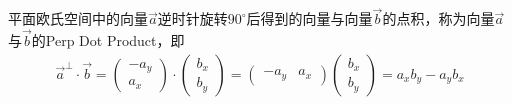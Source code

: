 \begin{definition}
  平面欧氏空间中的向量$\vec a$逆时针旋转$90^\circ$后得到的向量与向量$\vec b$的点积，称为向量$\vec a$与$\vec b$的Perp Dot Product，即
  \begin{align*}
    \vec a^\perp \cdot \vec b =
    \begin{pmatrix}
      -a_y\\ a_x
    \end{pmatrix} \cdot
    \begin{pmatrix}
      b_x\\ b_y
    \end{pmatrix} =
    \begin{pmatrix}
      -a_y & a_x
    \end{pmatrix}
    \begin{pmatrix}
      b_x\\ b_y
    \end{pmatrix} =
    a_xb_y - a_yb_x
  \end{align*}
\end{definition}

